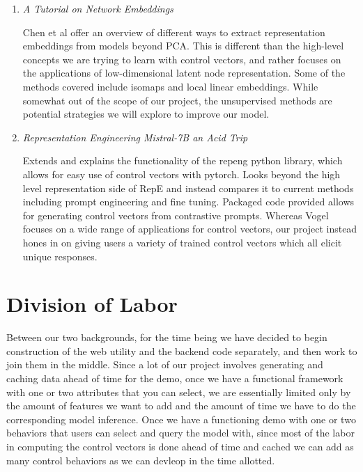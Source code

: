 \documentclass[11pt,a4paper]{article}
\begin{document}
\begin{enumerate}
\item \emph{A Tutorial on Network Embeddings}~\cite{chen2018network}

Chen et al offer an overview of different ways to extract representation embeddings from models beyond PCA. This is different than the high-level concepts we are trying to learn with control vectors, and rather focuses on the applications of low-dimensional latent node representation. Some of the methods covered include isomaps and local linear embeddings. While somewhat out of the scope of our project, the unsupervised methods are potential strategies we will explore to improve our model.

\item \emph{Representation Engineering Mistral-7B an Acid Trip}~\cite{vogel2024repeng}

Extends and explains the functionality of the repeng python library, which allows for easy use of control vectors with pytorch. Looks beyond the high level representation side of RepE and instead compares it to current methods including prompt engineering and fine tuning. Packaged code provided allows for generating control vectors from contrastive prompts. Whereas Vogel focuses on a wide range of applications for control vectors, our project instead hones in on giving users a variety of trained control vectors which all elicit unique responses.

\end{enumerate}

\section{Division of Labor}
Between our two backgrounds, for the time being we have decided to begin construction of the web utility and the backend code separately, and then work to join them in the middle. Since a lot of our project involves generating and caching data ahead of time for the demo, once we have a functional framework with one or two attributes that you can select, we are essentially limited only by the amount of features we want to add and the amount of time we have to do the corresponding model inference. Once we have a functioning demo with one or two behaviors that users can select and query the model with, since most of the labor in computing the control vectors is done ahead of time and cached we can add as many control behaviors as we can devleop in the time allotted.
\end{document}
